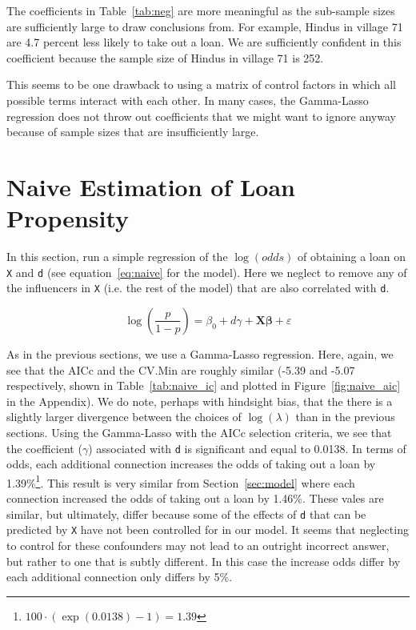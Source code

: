 \documentclass[11pt, fleqn]{article}
\begin{document}
The coefficients in Table~\ref{tab:neg} are more meaningful as the sub-sample sizes are sufficiently large to draw conclusions from. For example, Hindus in village 71 are 4.7 percent less likely to take out a loan. We are sufficiently confident in this coefficient because the sample size of Hindus in village 71 is 252. 

This seems to be one drawback to using a matrix of control factors in which all possible terms interact with each other. In many cases, the Gamma-Lasso regression does not throw out coefficients that we might want to ignore anyway because of sample sizes that are insufficiently large. 




\section{Naive Estimation of Loan Propensity}

In this section, run a simple regression of the $\log(odds)$ of obtaining a loan on \texttt{X} and \texttt{d} (see equation~\ref{eq:naive} for the model).  Here we neglect to remove any of the influencers in \texttt{X} (i.e. the rest of the model) that are also correlated with \texttt{d}.

\begin{equation} \label{eq:naive}
\log\left(\frac{p}{1-p}\right) = \beta_0 + d \gamma + \bm{X}\bm{\beta} + \varepsilon
\end{equation}

As in the previous sections, we use a Gamma-Lasso regression.  Here, again, we see that the AICc and the CV.Min are roughly similar (-5.39 and -5.07 respectively, shown in Table~\ref{tab:naive_ic} and plotted in Figure~\ref{fig:naive_aic} in the Appendix).  We do note, perhaps with hindsight bias, that the there is a slightly larger divergence between the choices of $\log(\lambda)$ than in the previous sections.  Using the Gamma-Lasso with the AICc selection criteria, we see that the coefficient ($\gamma$) associated with \texttt{d} is significant and equal to 0.0138.  In terms of odds, each additional connection increases the odds of taking out a loan by 1.39\%\footnote{$100 \cdot \left( \exp(0.0138) - 1\right) = 1.39$}.  This result is very similar from Section~\ref{sec:model} where each connection increased the odds of taking out a loan by 1.46\%.  These vales are similar, but ultimately, differ because some of the effects of \texttt{d} that can be predicted by \texttt{X} have not been controlled for in our model.  It seems that neglecting to control for these confounders may not lead to an outright incorrect answer, but rather to one that is subtly different.  In this case the increase odds differ by each additional connection only differs by 5\%.
\end{document}
